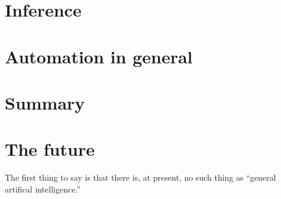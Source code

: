 \documentclass[10pt, a4paper, twocolumn]{article}
\begin{document}
\section{Inference}

\section{Automation in general}

\section{Summary}

\section{The future}

The first thing to say is that there is, at present, no such thing as ``general
artifical intelligence.''
\end{document}
